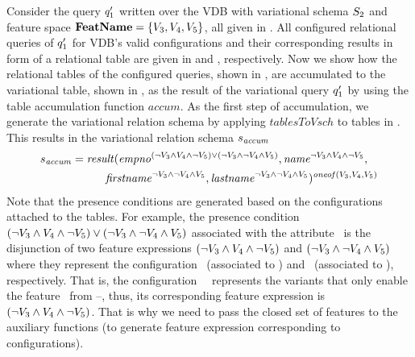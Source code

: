 

\begin{example}
\label{eg:acc-table-from-conf}
Consider the query $\VVal {\vQ_1}$ written over the VDB with variational schema $\vSch_2$ and 
feature space $\fSet = \setDef {\vThree, \vFour, \vFive}$, all given in . 
%
All configured relational queries of $\VVal {\vQ_1}$ for VDB's valid configurations and their
corresponding results in form of a relational table are given
in  and , respectively. 
%
Now we show how the relational tables of the configured queries, shown in , are accumulated 
to the variational table, shown in , as the result of the variational query $\VVal \vQ_1$ by 
using the table accumulation function $\mathit{accum}$.
%
As the first step of accumulation, we generate the variational relation schema by
applying $\mathit{tablesToVsch}$ to tables in . 
This results in the variational relation schema $\vRelSch_{\mathit{accum}}$
%
\begin{alignat*}{1}
\vRelSch_{\mathit{accum}} &= \mathit{result} (\annot [(\neg \vThree \wedge \vFour \wedge \neg \vFive)\vee(\neg \vThree \wedge \neg \vFour \wedge \vFive)] \empno, \annot [\neg \vThree \wedge \vFour \wedge \neg \vFive] \name,\\
&\hspace{30pt}\annot [\neg \vThree \wedge \neg \vFour \wedge \vFive] \fname, \annot [\neg \vThree \wedge \neg \vFour \wedge \vFive] \lname)^{\oneof {\vThree,\vFour,\vFive}}
\end{alignat*}
%
\noindent
Note that the presence conditions are generated based on the configurations attached to
the tables. For example, the presence condition $(\neg \vThree \wedge \vFour \wedge \neg \vFive)\vee(\neg \vThree \wedge \neg \vFour \wedge \vFive)$ associated with the attribute \empno\
is the disjunction of  two feature expressions $(\neg \vThree \wedge \vFour \wedge \neg \vFive)$
and $(\neg \vThree \wedge \neg \vFour \wedge \vFive)$ where they represent the configuration
\setDef \vFour\ (associated to \tabref{vq-conf2}) and \setDef \vFive\ (associated to ),
respectively. That is, the configuration \setDef\ \vFour\ represents the variants that only enable the
feature \vFour\ from \vThree--\vFive, thus, its corresponding feature expression is $(\neg \vThree \wedge \vFour \wedge \neg \vFive)$. That is why we need to pass the closed set of features 
to the auxiliary functions (to generate feature expression corresponding to configurations).


\end{example}
